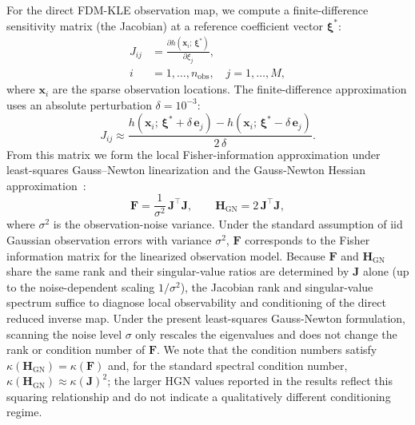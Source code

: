 \documentclass[pdflatex,sn-mathphys,Numbered,iicol]{sn-jnl}
\newcommand{\bxiast}{\boldsymbol{\xi}^{*}}
\newcommand{\nobs}{n_{\mathrm{obs}}}
\begin{document}
For the direct FDM-KLE observation map, we compute a finite-difference
sensitivity matrix (the Jacobian) at a reference coefficient vector
$\bxiast$:
\begin{equation}
  \begin{aligned}
  J_{ij} &= \frac{\partial h(\mathbf{x}_i;\, \bxiast)}{\partial \xi_j},\\
  i &= 1,\ldots,\nobs, \quad j = 1,\ldots,M,
  \end{aligned}
  \label{eq:jacobian}
\end{equation}
where $\mathbf{x}_i$ are the sparse observation locations. The
finite-difference approximation uses an absolute perturbation
$\delta = 10^{-3}$:
\begin{equation}
  J_{ij} \approx
    \frac{h(\mathbf{x}_i;\, \bxiast + \delta\,\mathbf{e}_j)
          - h(\mathbf{x}_i;\, \bxiast - \delta\,\mathbf{e}_j)}
         {2\,\delta}.
  \label{eq:fd-jacobian}
\end{equation}
From this matrix we form the local Fisher-information approximation under
least-squares Gauss--Newton linearization and the Gauss-Newton Hessian
approximation~\cite{sun1990identifiability, tarantola2005inverse,
aster2018parameter}:
\begin{equation}
  \mathbf{F} = \frac{1}{\sigma^2} \, \mathbf{J}^\top \mathbf{J},
  \qquad
  \mathbf{H}_{\mathrm{GN}} = 2\,\mathbf{J}^\top \mathbf{J},
  \label{eq:fim-hgn}
\end{equation}
where $\sigma^2$ is the observation-noise variance. Under the standard
assumption of iid Gaussian observation errors with variance $\sigma^2$,
$\mathbf{F}$ corresponds to the Fisher information matrix for the linearized
observation model. Because $\mathbf{F}$ and
$\mathbf{H}_{\mathrm{GN}}$ share the same rank and their singular-value
ratios are determined by $\mathbf{J}$ alone (up to the noise-dependent
scaling $1/\sigma^2$), the Jacobian rank and singular-value spectrum suffice
to diagnose local observability and conditioning of the direct reduced inverse
map. Under the present least-squares Gauss-Newton formulation, scanning the
noise level $\sigma$ only rescales the eigenvalues and does
not change the rank or condition number of $\mathbf{F}$. We note that the
condition numbers satisfy $\kappa(\mathbf{H}_{\mathrm{GN}}) =
\kappa(\mathbf{F})$ and, for the standard spectral condition number,
$\kappa(\mathbf{H}_{\mathrm{GN}}) \approx \kappa(\mathbf{J})^2$; the larger
HGN values reported in the results reflect this squaring relationship and do
not indicate a qualitatively different conditioning regime.
\end{document}
